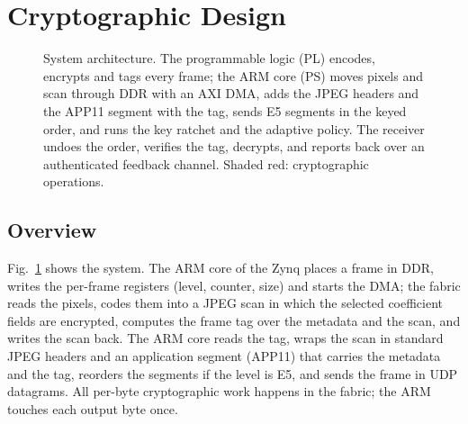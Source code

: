 \section{Cryptographic Design}\label{sec:design}
\begin{figure}[t]
\centering
\resizebox{0.95\textwidth}{!}{}
\caption{System architecture. The programmable logic (PL) encodes, encrypts and tags every frame; the ARM core (PS) moves pixels and scan through DDR with an AXI DMA, adds the JPEG headers and the APP11 segment with the tag, sends E5 segments in the keyed order, and runs the key ratchet and the adaptive policy. The receiver undoes the order, verifies the tag, decrypts, and reports back over an authenticated feedback channel. Shaded red: cryptographic operations.}
\label{fig:system}
\end{figure}

\subsection{Overview}
Fig.~\ref{fig:system} shows the system. The ARM core of the Zynq places a frame in DDR, writes the per-frame registers (level, counter, size) and starts the DMA; the fabric reads the pixels, codes them into a JPEG scan in which the selected coefficient fields are encrypted, computes the frame tag over the metadata and the scan, and writes the scan back. The ARM core reads the tag, wraps the scan in standard JPEG headers and an application segment (APP11) that carries the metadata and the tag, reorders the segments if the level is E5, and sends the frame in UDP datagrams. All per-byte cryptographic work happens in the fabric; the ARM touches each output byte once.

